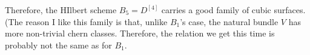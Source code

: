 \documentclass[12 pt]{amsart}
\newcommand{\<}{\left\langle}
\renewcommand{\>}{\right\rangle}
\begin{document}
Therefore, the HIlbert scheme $B_{5} = D^{[4]}$ carries a good family
of cubic surfaces.  (The reason I like this family is that, unlike
$B_1$'s case, the natural bundle $V$ has more non-trivial chern
classes. Therefore, the relation we get this time is probably not the
same as for $B_1$.

%
%
\end{document}
